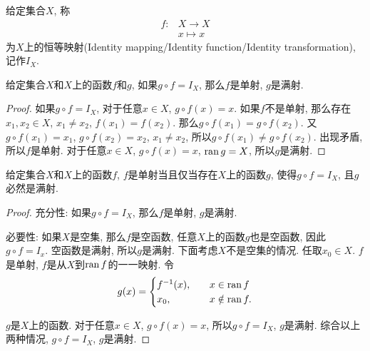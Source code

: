 \begin{definition}
	给定集合$X$, 称
	\begin{align*}
		f\colon & X\rightarrow X \\
		& x\mapsto x
	\end{align*}
	为$X$上的恒等映射(Identity mapping/Identity function/Identity transformation), 记作$I_X$.
\end{definition}

\begin{proposition}
	给定集合$X$和$X$上的函数$f$和$g$, 如果$g\circ f=I_X$, 那么$f$是单射, $g$是满射.
\end{proposition}

\begin{proof}
	如果$g\circ f=I_X$, 对于任意$x\in X$, $g\circ f(x)=x$. 如果$f$不是单射, 那么存在$x_1,x_2\in X$, $x_1\neq x_2$, $f(x_1)=f(x_2)$. 那么$g\circ f(x_1)=g\circ f(x_2)$. 又$g\circ f(x_1)=x_1$, $g\circ f(x_2)=x_2$, $x_1\neq x_2$, 所以$g\circ f(x_1)\neq g\circ f(x_2)$. 出现矛盾, 所以$f$是单射. 对于任意$x\in X$, $g\circ f(x)=x$, $\operatorname{ran} g=X$, 所以$g$是满射.
\end{proof}

\begin{proposition}
	给定集合$X$和$X$上的函数$f$, $f$是单射当且仅当存在$X$上的函数$g$, 使得$g\circ f=I_X$, 且$g$必然是满射.
\end{proposition}

\begin{proof}
	充分性: 如果$g\circ f=I_X$, 那么$f$是单射, $g$是满射.
	
	必要性: 如果$X$是空集, 那么$f$是空函数, 任意$X$上的函数$g$也是空函数, 因此$g\circ f=I_x$. 空函数是满射, 所以$g$是满射. 下面考虑$X$不是空集的情况. 任取$x_0\in X$. $f$是单射, $f$是从$X$到$\operatorname{ran} f$的一一映射. 令
	\begin{equation*}
		g(x)=
		\begin{cases}
			f^{-1}(x), \quad & x\in \operatorname{ran} f\\
			x_0, & x\notin \operatorname{ran} f.
		\end{cases}
	\end{equation*}
	
	$g$是$X$上的函数. 对于任意$x\in X$, $g\circ f(x)=x$, 所以$g\circ f=I_X$, $g$是满射. 综合以上两种情况, $g\circ f=I_X$, $g$是满射.
\end{proof}

